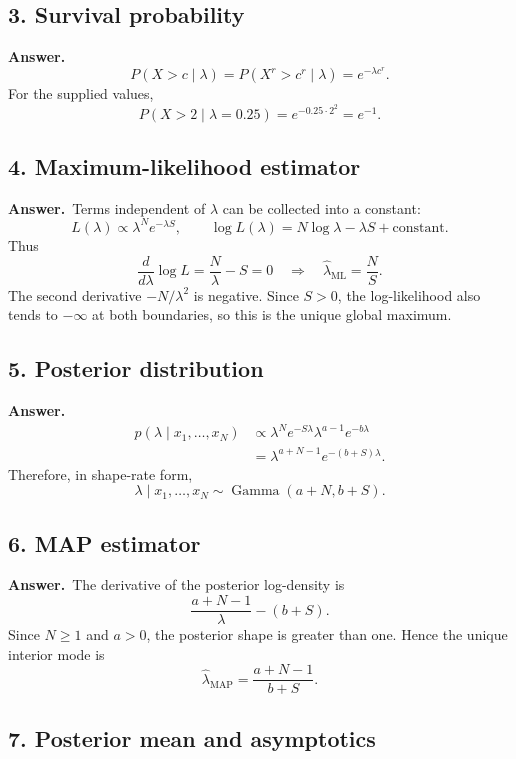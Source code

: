 \documentclass[11pt,a4paper]{article}
\newcommand{\answer}{\textbf{Answer.}\ }
\begin{document}
\subsection*{3. Survival probability}

\answer
\[
  P(X>c\mid\lambda)
  =P(X^r>c^r\mid\lambda)
  =\boxed{e^{-\lambda c^r}}.
\]
For the supplied values,
\[
  P(X>2\mid\lambda=0.25)=e^{-0.25\cdot 2^2}
  =\boxed{e^{-1}}.
\]

\subsection*{4. Maximum-likelihood estimator}

\answer Terms independent of $\lambda$ can be collected into a constant:
\[
  L(\lambda)\propto\lambda^Ne^{-\lambda S},
  \qquad
  \log L(\lambda)=N\log\lambda-\lambda S+\text{constant}.
\]
Thus
\[
  \frac{d}{d\lambda}\log L=\frac{N}{\lambda}-S=0
  \quad\Longrightarrow\quad
  \boxed{\widehat\lambda_{\mathrm{ML}}=\frac{N}{S}}.
\]
The second derivative $-N/\lambda^2$ is negative. Since $S>0$, the log-likelihood also tends to $-\infty$ at both boundaries, so this is the unique global maximum.

\subsection*{5. Posterior distribution}

\answer
\begin{align*}
  p(\lambda\mid x_1,\ldots,x_N)
  &\propto\lambda^Ne^{-S\lambda}
    \lambda^{a-1}e^{-b\lambda}\\
  &=\lambda^{a+N-1}e^{-(b+S)\lambda}.
\end{align*}
Therefore, in shape-rate form,
\[
  \boxed{\lambda\mid x_1,\ldots,x_N
  \sim\operatorname{Gamma}(a+N,b+S)}.
\]

\subsection*{6. MAP estimator}

\answer The derivative of the posterior log-density is
\[
  \frac{a+N-1}{\lambda}-(b+S).
\]
Since $N\geq1$ and $a>0$, the posterior shape is greater than one. Hence the unique interior mode is
\[
  \boxed{\widehat\lambda_{\mathrm{MAP}}
  =\frac{a+N-1}{b+S}}.
\]

\subsection*{7. Posterior mean and asymptotics}
\end{document}

